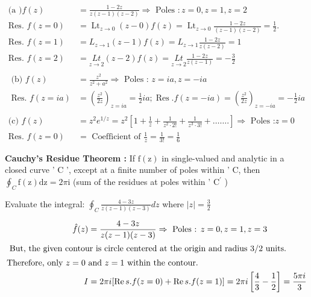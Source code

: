 \begin{answer}
	\begin{align*}
	\text{(a )}f(z)&=\frac{1-2 z}{z(z-1)(z-2)} \Rightarrow \text { Poles }: z=0, z=1, z=2\\
	\text{Res. }f(z=0)&=\operatorname{Lt}_{z \rightarrow 0}(z-0) f(z)=\operatorname{Lt}_{z \rightarrow 0} \frac{1-2 z}{(z-1)(z-2)}=\frac{1}{2}.\\
	\text{Res. } f(z=1)&=L_{z \rightarrow 1}(z-1) f(z)=L_{z \rightarrow 1} \frac{1-2 z}{z(z-2)}=1\\
	\text{Res. }f(z=2)&=\underset{z \rightarrow 2}{L t}(z-2) f(z)=\underset{z \rightarrow 2}{L t} \frac{1-2 z}{z(z-1)}=-\frac{3}{2}\\\\
\text{	(b) }f(z)&=\frac{z^{2}}{z^{2}+a^{2}} \Rightarrow\text{ Poles : }z=i a, z=-i a\\
	\text { Res. } f(z=i a)&=\left(\frac{z^{2}}{2 z}\right)_{z=i a}=\frac{1}{2} i a ; \operatorname{Res} . f(z=-i a)=\left(\frac{z^{2}}{2 z}\right)_{z=-i a}=-\frac{1}{2} i a\\\\
	\text{(c) }f(z)&=z^{2} e^{1 / z}=z^{2}\left[1+\frac{1}{z}+\frac{1}{z^{2} \cdot 2 !}+\frac{1}{z^{3} \cdot 3 !}+\ldots \ldots .\right] \Rightarrow\text{ Poles :} z=0\\
	\text{Res. }f(z=0)&=\text{ Coefficient of }\frac{1}{z}=\frac{1}{3 !}=\frac{1}{6}
	\end{align*}
\end{answer}
\textbf{Cauchy's Residue Theorem :}
If $\mathrm{f}(\mathrm{z})$ in single-valued and analytic in a closed curve ' $\mathrm{C}$ ', except at a finite number of poles within ' $\mathrm{C}$, then $\oint_{C} \mathrm{f}(\mathrm{z}) \mathrm{dz}=2 \pi \mathrm{i}$ (sum of the residues at poles within ' $\mathrm{C}^{\prime}$ )
\begin{exercise}
	Evaluate the integral: $\oint_{C} \frac{4-3 z}{z(z-1)(z-3)} d z$ where $|z|=\frac{3}{2}$
\end{exercise}
\begin{answer}
	\begin{align*}
	\hat{f}(z)&=\frac{4-3 z}{z(z-1)(z-3)} \Rightarrow\text{ Poles : }z=0, z=1, z=3\\
\intertext{	But, the given contour is circle centered at the origin and radius $3 / 2$ units.} 
\text{Therefore, only $z=0$ }&\text{and $z=1$ within the contour.}\\
	I&=2 \pi i[\operatorname{Re} s . f(z=0)+\operatorname{Re} s . f(z=1)]=2 \pi i\left[\frac{4}{3}-\frac{1}{2}\right]=\frac{5 \pi i}{3}
	\end{align*}
\end{answer}
